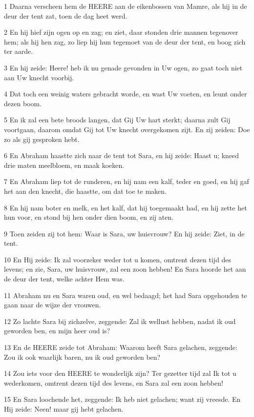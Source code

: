\par 1 Daarna verscheen hem de HEERE aan de eikenbossen van Mamre, als hij in de deur der tent zat, toen de dag heet werd.
\par 2 En hij hief zijn ogen op en zag; en ziet, daar stonden drie mannen tegenover hem; als hij hen zag, zo liep hij hun tegemoet van de deur der tent, en boog zich ter aarde.
\par 3 En hij zeide: Heere! heb ik nu genade gevonden in Uw ogen, zo gaat toch niet aan Uw knecht voorbij.
\par 4 Dat toch een weinig waters gebracht worde, en wast Uw voeten, en leunt onder dezen boom.
\par 5 En ik zal een bete broods langen, dat Gij Uw hart sterkt; daarna zult Gij voortgaan, daarom omdat Gij tot Uw knecht overgekomen zijt. En zij zeiden: Doe zo als gij gesproken hebt.
\par 6 En Abraham haastte zich naar de tent tot Sara, en hij zeide: Haast u; kneed drie maten meelbloem, en maak koeken.
\par 7 En Abraham liep tot de runderen, en hij nam een kalf, teder en goed, en hij gaf het aan den knecht, die haastte, om dat toe te maken.
\par 8 En hij nam boter en melk, en het kalf, dat hij toegemaakt had, en hij zette het hun voor, en stond bij hen onder dien boom, en zij aten.
\par 9 Toen zeiden zij tot hem: Waar is Sara, uw huisvrouw? En hij zeide: Ziet, in de tent.
\par 10 En Hij zeide: Ik zal voorzeker weder tot u komen, omtrent dezen tijd des levens; en zie, Sara, uw huisvrouw, zal een zoon hebben! En Sara hoorde het aan de deur der tent, welke achter Hem was.
\par 11 Abraham nu en Sara waren oud, en wel bedaagd; het had Sara opgehouden te gaan naar de wijze der vrouwen.
\par 12 Zo lachte Sara bij zichzelve, zeggende: Zal ik wellust hebben, nadat ik oud geworden ben, en mijn heer oud is?
\par 13 En de HEERE zeide tot Abraham: Waarom heeft Sara gelachen, zeggende: Zou ik ook waarlijk baren, nu ik oud geworden ben?
\par 14 Zou iets voor den HEERE te wonderlijk zijn? Ter gezetter tijd zal Ik tot u wederkomen, omtrent dezen tijd des levens, en Sara zal een zoon hebben!
\par 15 En Sara loochende het, zeggende: Ik heb niet gelachen; want zij vreesde. En Hij zeide: Neen! maar gij hebt gelachen.
